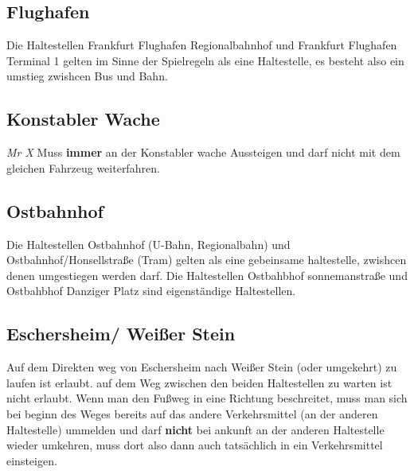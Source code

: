 \documentclass[12pt,a4paper]{article}
\begin{document}
\subsection{Flughafen}
Die Haltestellen Frankfurt Flughafen Regionalbahnhof und Frankfurt Flughafen Terminal 1 gelten im Sinne der Spielregeln als eine Haltestelle, es besteht also ein umstieg zwishcen Bus und Bahn.

\subsection{Konstabler Wache}
\textit{Mr X} Muss \textbf{immer} an der Konstabler wache Aussteigen und darf nicht mit dem gleichen Fahrzeug weiterfahren.

\subsection{Ostbahnhof}
Die Haltestellen Ostbahnhof (U-Bahn, Regionalbahn) und Ostbahnhof/Honsellstraße (Tram) gelten als eine gebeinsame haltestelle, zwishcen denen umgestiegen werden darf.
Die Haltestellen Ostbahbhof sonnemanstraße und Ostbahbhof Danziger Platz sind eigenständige Haltestellen.

\subsection{Eschersheim/ Weißer Stein}
Auf dem Direkten weg von Eschersheim nach Weißer Stein (oder umgekehrt) zu laufen ist erlaubt. 
auf dem Weg zwischen den beiden Haltestellen zu warten ist nicht erlaubt.
Wenn man den Fußweg in eine Richtung beschreitet, muss man sich bei beginn des Weges bereits auf das andere Verkehrsmittel (an der anderen Haltestelle) ummelden und darf \textbf{nicht} bei ankunft an der anderen Haltestelle wieder umkehren, muss dort also dann auch tatsächlich in ein Verkehrsmittel einsteigen.
\end{document}
